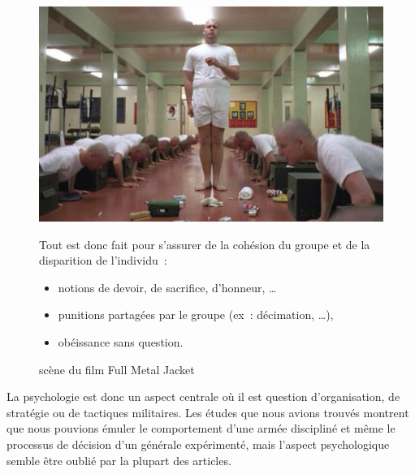 \documentclass{article}
\begin{document}
\begin{figure}[H]
\centering
\begin{minipage}[H]{0.55\linewidth}
	\centering
	\includegraphics[width=\textwidth]{../ressources/donut}
	\caption{scène du film Full Metal Jacket}
\end{minipage}
\hspace{0.05\linewidth}
\begin{minipage}[H]{0.35\linewidth}
Tout est donc fait pour s'assurer de la cohésion du groupe et de la disparition de l'individu~:
\begin{itemize}
\item notions de devoir, de sacrifice, d'honneur, \dots
\item punitions partagées par le groupe (ex~: décimation, \dots),
\item obéissance sans question.
\end{itemize}
\end{minipage}
\hfill
\end{figure}
La psychologie est donc un aspect centrale où il est question d'organisation, de stratégie ou de tactiques militaires. Les études que nous avions trouvés montrent que nous pouvions émuler le comportement d'une armée discipliné et même le processus de décision d'un générale expérimenté, mais l'aspect psychologique semble être oublié par la plupart des articles.

\newpage


\end{document}

